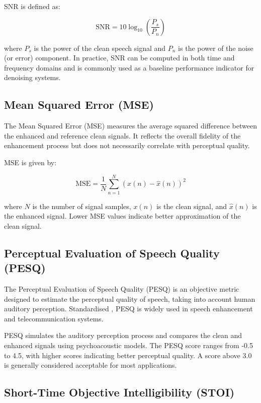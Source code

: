 SNR is defined as:

\begin{equation}
    \text{SNR} = 10 \log_{10} \left( \frac{P_s}{P_n} \right)
\end{equation}

where \( P_s \) is the power of the clean speech signal and \( P_n \) is the power of the noise (or error) component. In practice, SNR can be computed in both time and frequency domains and is commonly used as a baseline performance indicator for denoising systems.

\subsection{Mean Squared Error (MSE)}
\label{subsec:mse}

The Mean Squared Error (MSE) measures the average squared difference between the enhanced and reference clean signals. It reflects the overall fidelity of the enhancement process but does not necessarily correlate with perceptual quality.

MSE is given by:

\begin{equation}
    \text{MSE} = \frac{1}{N} \sum_{n=1}^{N} (x(n) - \hat{x}(n))^2
\end{equation}

where \( N \) is the number of signal samples, \( x(n) \) is the clean signal, and \( \hat{x}(n) \) is the enhanced signal. Lower MSE values indicate better approximation of the clean signal.

\subsection{Perceptual Evaluation of Speech Quality (PESQ)}
\label{subsec:pesq}

The Perceptual Evaluation of Speech Quality (PESQ) is an objective metric designed to estimate the perceptual quality of speech, taking into account human auditory perception. Standardised \cite{itutp862}, PESQ is widely used in speech enhancement and telecommunication systems.

PESQ simulates the auditory perception process and compares the clean and enhanced signals using psychoacoustic models. The PESQ score ranges from -0.5 to 4.5, with higher scores indicating better perceptual quality. A score above 3.0 is generally considered acceptable for most applications.

\subsection{Short-Time Objective Intelligibility (STOI)}
\label{subsec:stoi}

